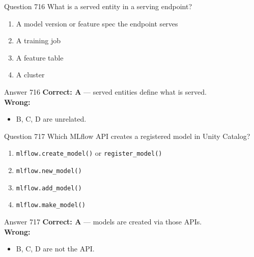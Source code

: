 \documentclass[aspectratio=169,11pt]{beamer}
\begin{document}
	\begin{frame}{Question 716}
		What is a served entity in a serving endpoint?
		\begin{enumerate}[label=\Alph*.]
			\item A model version or feature spec the endpoint serves
			\item A training job
			\item A feature table
			\item A cluster
		\end{enumerate}
	\end{frame}
	\begin{frame}{Answer 716}
		\textbf{Correct: A} --- served entities define what is served.\\
		\vspace{0.5em}
		\textbf{Wrong:}
		\begin{itemize}
			\item B, C, D are unrelated.
		\end{itemize}
	\end{frame}
	
	\begin{frame}{Question 717}
		Which MLflow API creates a registered model in Unity Catalog?
		\begin{enumerate}[label=\Alph*.]
			\item \texttt{mlflow.create\_model()} or \texttt{register\_model()}
			\item \texttt{mlflow.new\_model()}
			\item \texttt{mlflow.add\_model()}
			\item \texttt{mlflow.make\_model()}
		\end{enumerate}
	\end{frame}
	\begin{frame}{Answer 717}
		\textbf{Correct: A} --- models are created via those APIs.\\
		\vspace{0.5em}
		\textbf{Wrong:}
		\begin{itemize}
			\item B, C, D are not the API.
		\end{itemize}
	\end{frame}
	
\end{document}
